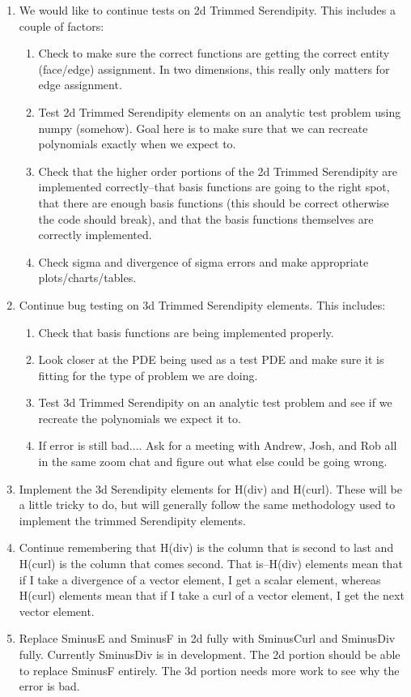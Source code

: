 \documentclass[12pt]{extarticle}
\newcommand{\<}{\langle}
\renewcommand{\>}{\rangle}
\theoremstyle{definition}
\begin{document}
\begin{enumerate}
    \item We would like to continue tests on 2d Trimmed Serendipity.  This includes a couple of factors:
    \begin{enumerate}
        \item Check to make sure the correct functions are getting the correct entity (face/edge) assignment.  In two dimensions, this really only matters for edge assignment.
        \item Test 2d Trimmed Serendipity elements on an analytic test problem using numpy (somehow).  Goal here is to make sure that we can recreate polynomials exactly when we expect to.
        \item Check that the higher order portions of the 2d Trimmed Serendipity are implemented correctly--that basis functions are going to the right spot, that there are enough basis functions (this should be correct otherwise the code should break), and that the basis functions themselves are correctly implemented.
        \item Check sigma and divergence of sigma errors and make appropriate plots/charts/tables.  
    \end{enumerate}
    \item Continue bug testing on 3d Trimmed Serendipity elements.  This includes:
    \begin{enumerate}
        \item Check that basis functions are being implemented properly.
        \item Look closer at the PDE being used as a test PDE and make sure it is fitting for the type of problem we are doing.
        \item Test 3d Trimmed Serendipity on an analytic test problem and see if we recreate the polynomials we expect it to.
        \item If error is still bad....  Ask for a meeting with Andrew, Josh, and Rob all in the same zoom chat and figure out what else could be going wrong.
    \end{enumerate}
    \item Implement the 3d Serendipity elements for H(div) and H(curl).  These will be a little tricky to do, but will generally follow the same methodology used to implement the trimmed Serendipity elements.
    \item Continue remembering that H(div) is the column that is second to last and H(curl) is the column that comes second.  That is--H(div) elements mean that if I take a divergence of a vector element, I get a scalar element, whereas H(curl) elements mean that if I take a curl of a vector element, I get the next vector element.  
    \item Replace SminusE and SminusF in 2d fully with SminusCurl and SminusDiv fully.  Currently SminusDiv is in development.  The 2d portion should be able to replace SminusF entirely.  The 3d portion needs more work to see why the error is bad.  
\end{enumerate}
\end{document}
